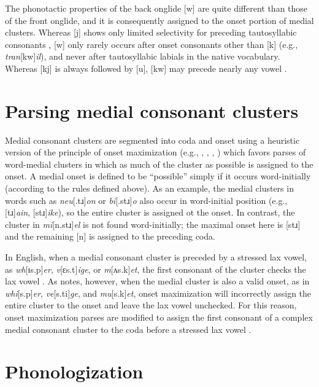 The phonotactic properties of the back onglide [w] are quite different than those of the front onglide, and it is consequently assigned to the onset portion of medial clusters. Whereas [j] shows only limited selectivity for preceding tautosyllabic consonants \citep{Kaye1996}, [w] only rarely occurs after onset consonants other than [k] (e.g., \emph{tran}[kw]\emph{il}), and never after tautosyllabic labials in the native vocabulary. Whereas [kj] is always followed by [u], [kw] may precede nearly any vowel \citep[161]{Davis1995}.

\section{Parsing medial consonant clusters}

Medial consonant clusters are segmented into coda and onset using a heuristic version of the principle of onset maximization (e.g., \citealp[42f.]{Kahn1976}, \citealp{Kurylowicz1948}, \citealp[75]{Pulgram1970}, \citealp[][358f.]{Selkirk1982b}) which favors parses of word-medial clusters in which as much of the cluster as possible is assigned to the onset. A medial onset is defined to be ``possible'' simply if it occurs word-initially (according to the rules defined above). As an example, the medial clusters in words such as \emph{neu}[.tɹ]\emph{on} or \emph{bi}[.stɹ]\emph{o} also occur in word-initial position (e.g., [tɹ]\emph{ain}, [stɹ]\emph{ike}), so the entire cluster is assigned ot the onset. In contrast, the cluster in \emph{mi}[n.stɹ]\emph{el} is not found word-initially; the maximal onset here is [stɹ] and the remaining [n] is assigned to the preceding coda.

In English, when a medial consonant cluster is preceded by a stressed lax vowel, as \emph{wh}[ɪs.p]\emph{er}, \emph{v}[ɛs.t]\emph{ige}, or \emph{m}[ʌs.k]\emph{et}, the first consonant of the cluster checks the lax vowel \citep[3]{Hammond1997}. As \citet[55]{Harris1994} notes, however, when the medial cluster is also a valid onset, as in \emph{whi}[s.p]\emph{er}, \emph{ve}[s.ti]\emph{ge}, and \emph{mu}[s.k]\emph{et}, onset maximization will incorrectly assign the entire cluster to the onset and leave the lax vowel unchecked. For this reason, onset maximization parses are modified to assign the first consonant of a complex medial consonant cluster to the coda before a stressed lax vowel \citep[48]{Pulgram1970}.

\section{Phonologization}

